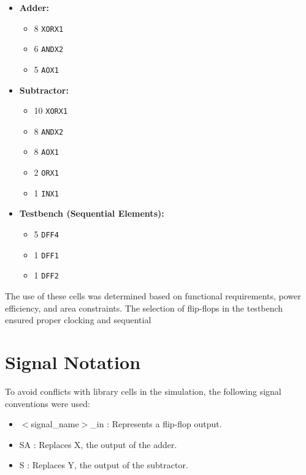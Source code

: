 \documentclass[a4paper,12pt]{article}
\begin{document}
\begin{itemize}
    \item \textbf{Adder:}
    \begin{itemize}
        \item 8 \texttt{XORX1}
        \item 6 \texttt{ANDX2}
        \item 5 \texttt{AOX1}
    \end{itemize}

    \item \textbf{Subtractor:}
    \begin{itemize}
        \item 10 \texttt{XORX1}
        \item 8 \texttt{ANDX2}
        \item 8 \texttt{AOX1}
        \item 2 \texttt{ORX1}
        \item 1 \texttt{INX1}
    \end{itemize}

    \item \textbf{Testbench (Sequential Elements):}
    \begin{itemize}
        \item 5 \texttt{DFF4}
        \item 1 \texttt{DFF1}
        \item 1 \texttt{DFF2}
    \end{itemize}
\end{itemize}

The use of these cells was determined based on functional requirements, power efficiency, and area constraints. The selection of flip-flops in the testbench ensured proper clocking and sequential



\section{Signal Notation}
To avoid conflicts with library cells in the simulation, the following signal conventions were used:
\begin{itemize}
    \item $<$signal\_name$>$\_in : Represents a flip-flop output.
    \item SA : Replaces X, the output of the adder.
    \item S : Replaces Y, the output of the subtractor.
\end{itemize}
\end{document}
